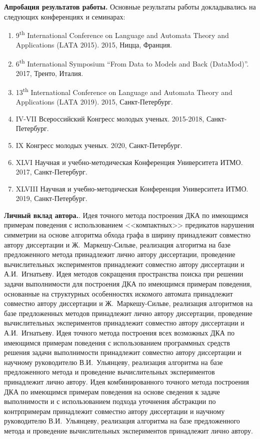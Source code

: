 \textbf{Апробация результатов работы.}
Основные результаты работы докладывались на следующих конференциях и семинарах:
\begin{enumerate}
  \item 9\textsuperscript{th} International Conference on Language and Automata Theory and Applications (LATA 2015). 2015, Ницца, Франция.
  \item 6\textsuperscript{th} International Symposium ``From Data to Models and Back (DataMod)''. 2017, Тренто, Италия.
  \item 13\textsuperscript{th} International Conference on Language and Automata Theory and Applications (LATA 2019). 2015, Санкт-Петербург.
  \item IV-VII Всероссийский Конгресс молодых ученых. 2015-2018, Санкт-Петербург.
  \item IX Конгресс молодых ученых. 2020, Санкт-Петербург.
  \item XLVI Научная и учебно-методическая Конференция Университета \mbox{ИТМО}. 2017, Санкт-Петербург.
  \item XLVIII Научная и учебно-методическая Конференция Университета ИТМО. 2019, Санкт-Петербург.
\end{enumerate}

\textbf{Личный вклад автора.}.
  Идея точного метода построения ДКА по имеющимся примерам поведения с использованием <<компактных>> предикатов нарушения симметрии на основе алгоритма обхода графа в ширину принадлежит совместно автору диссертации и Ж.~Маркешу-Сильве, реализация алгоритма на базе предложенного метода принадлежит лично автору диссертации, проведение вычислительных экспериментов принадлежит совместно автору диссертации и А.И.~Игнатьеву.
  Идея методов сокращения пространства поиска при решении задачи выполнимости для построения ДКА по имеющимся примерам поведения, основанные на структурных особенностях искомого автомата принадлежит совместно автору диссертации и Ж.~Маркешу-Сильве, реализация алгоритмов на базе предложенных методов принадлежит лично автору диссертации, проведение вычислительных экспериментов принадлежит совместно автору диссертации и А.И.~Игнатьеву.
  Идея точного метода построения всех возможных ДКА по имеющимся примерам поведения с использованием программных средств решения задачи выполнимости принадлежит совместно автору диссертации и научному руководителю В.И.~Ульянцеву, реализация алгоритма на базе предложенного метода и проведение вычислительных экспериментов принадлежит лично автору.
  Идея комбинированного точного метода построения ДКА по имеющимся примерам поведения на основе сведения к задаче выполнимости и с использованием подхода уточнения абстракции по контрпримерам принадлежит совместно автору диссертации и научному руководителю В.И.~Ульянцеву, реализация алгоритма на базе предложенного метода и проведение вычислительных экспериментов принадлежит лично автору.

